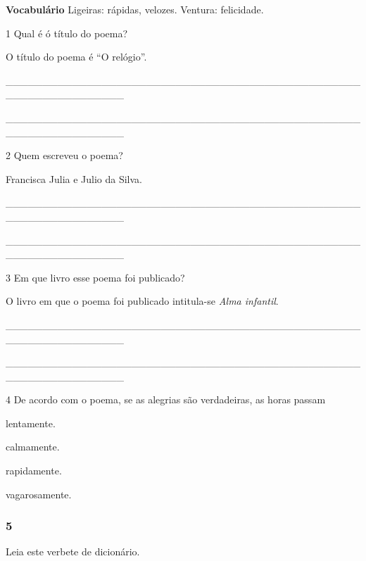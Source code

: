 \textbf{Vocabulário}
Ligeiras: rápidas, velozes.
Ventura: felicidade.

\num{1} Qual é ó título do poema?

O título do poema é ``O relógio''.

\_\_\_\_\_\_\_\_\_\_\_\_\_\_\_\_\_\_\_\_\_\_\_\_\_\_\_\_\_\_\_\_\_\_\_\_\_\_\_\_\_\_\_\_\_\_\_\_\_\_\_\_\_\_\_\_\_\_\_\_\_\_\_\_

\_\_\_\_\_\_\_\_\_\_\_\_\_\_\_\_\_\_\_\_\_\_\_\_\_\_\_\_\_\_\_\_\_\_\_\_\_\_\_\_\_\_\_\_\_\_\_\_\_\_\_\_\_\_\_\_\_\_\_\_\_\_\_\_

\num{2} Quem escreveu o poema?

Francisca Julia e Julio da Silva.

\_\_\_\_\_\_\_\_\_\_\_\_\_\_\_\_\_\_\_\_\_\_\_\_\_\_\_\_\_\_\_\_\_\_\_\_\_\_\_\_\_\_\_\_\_\_\_\_\_\_\_\_\_\_\_\_\_\_\_\_\_\_\_\_

\_\_\_\_\_\_\_\_\_\_\_\_\_\_\_\_\_\_\_\_\_\_\_\_\_\_\_\_\_\_\_\_\_\_\_\_\_\_\_\_\_\_\_\_\_\_\_\_\_\_\_\_\_\_\_\_\_\_\_\_\_\_\_\_

\num{3} Em que livro esse poema foi publicado?

O livro em que o poema foi publicado intitula-se \textit{Alma infantil}.

\_\_\_\_\_\_\_\_\_\_\_\_\_\_\_\_\_\_\_\_\_\_\_\_\_\_\_\_\_\_\_\_\_\_\_\_\_\_\_\_\_\_\_\_\_\_\_\_\_\_\_\_\_\_\_\_\_\_\_\_\_\_\_\_

\_\_\_\_\_\_\_\_\_\_\_\_\_\_\_\_\_\_\_\_\_\_\_\_\_\_\_\_\_\_\_\_\_\_\_\_\_\_\_\_\_\_\_\_\_\_\_\_\_\_\_\_\_\_\_\_\_\_\_\_\_\_\_\_

\num{4} De acordo com o poema, se as alegrias são verdadeiras, as horas passam

\begin{escolha}
  \item lentamente.
  \item calmamente.
  \item rapidamente.
  \item vagarosamente.
\end{escolha}


\subsubsection{5}\label{section-48}

Leia este verbete de dicionário.

